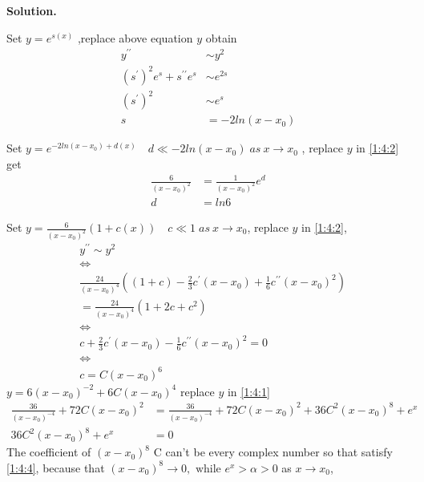 \documentclass[a4paper]{book}
\newenvironment{solution}%
{\noindent\textbf{Solution.}}%
{\qedhere}
\numberwithin{equation}{chapter}
\theoremstyle{definition}
\begin{document}
\begin{multicols}{2}
\begin{solution}
\begin{itemize}
	Set $ y = e^{s(x)} $ ,replace above equation $y$ obtain 
	\begin{equation} \label{1:4:2}
		\begin{aligned}
		 y^{\prime \prime} &\sim y^2 \\
		 (s^\prime)^2 e^s + s^{\prime \prime} e^s &\sim e^{2s} \\
		 (s^\prime)^2 &\sim  e^{s}\\
		 s &= -2ln(x-x_0) 
		\end{aligned}
	\end{equation}
	
	Set $y = e^{-2ln(x-x_0) + d(x)} \quad d \ll -2ln(x-x_0) \; as \ x \rightarrow x_0$ , replace $y$ in \ref{1:4:2} get
	\begin{equation}\nonumber
	\begin{split}
		\frac{6}{(x-x_0)^2} &= \frac{1}{(x-x_0)^2} e^d \\
		d &= ln6
		\end{split}
	\end{equation}
	
	Set $y = \frac{6}{(x-x_0)^2}(1 + c(x)) \quad c \ll 1 \; as \ x \rightarrow x_0$, replace $y$ in \ref{1:4:2},
	\begin{equation}\nonumber
		\begin{aligned}
			&y^{\prime \prime} \sim y^2 \\ 
			&\Longleftrightarrow \\
			&\frac{24}{(x-x_0)^4}((1+c) - \frac{2}{3}c^\prime(x-x_0) + \frac{1}{6} c^{\prime \prime} (x-x_0)^2) \\ 
			&=	\frac{24}{(x-x_0)^4}(1 + 2c + c^2) \\
			&\Longleftrightarrow \\
			&c + \frac{2}{3}c^\prime(x-x_0) - \frac{1}{6}c^{\prime \prime}(x-x_0)^2 = 0 \\
			&\Longleftrightarrow \\
			&c = C(x-x_0)^6
		\end{aligned}
	\end{equation} 
	$y = 6(x-x_0)^{-2} + 6C(x-x_0)^{4} $ replace $y$ in \ref{1:4:1}
	\begin{equation}\label{1:4:4}
	\begin{aligned}
	\frac{36}{(x-x_0)^{-4}} + 72C(x-x_0)^2 &= \frac{36}{(x-x_0)^{-4}} + 72C(x-x_0)^2 + 36C^2(x-x_0)^8 + e^x \\
	36C^2(x-x_0)^8 + e^x &= 0
	\end{aligned}
	\end{equation}
	The coefficient of $(x-x_0)^8$ C can't be every complex number so that satisfy \ref{1:4:4}, because that $(x-x_0)^8 \rightarrow 0, \text{ while } e^x > \alpha > 0$ as $ x \rightarrow x_0$,
	

\end{itemize}
\end{solution}
\end{multicols}
\end{document}
